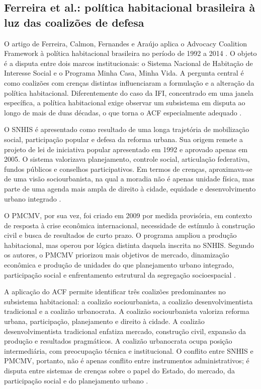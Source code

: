 \documentclass[12pt,a4paper]{article}
\begin{document}
\subsection{Ferreira et al.: política habitacional brasileira à luz das coalizões de defesa}
\label{sec:org0ee8abe}
O artigo de Ferreira, Calmon, Fernandes e Araújo aplica o Advocacy Coalition Framework à política habitacional brasileira no período de 1992 a 2014 \autocite{ferreira2019habitacional}. O objeto é a disputa entre dois marcos institucionais: o Sistema Nacional de Habitação de Interesse Social e o Programa Minha Casa, Minha Vida. A pergunta central é como coalizões com crenças distintas influenciaram a formulação e a alteração da política habitacional. Diferentemente do caso da IFI, concentrado em uma janela específica, a política habitacional exige observar um subsistema em disputa ao longo de mais de duas décadas, o que torna o ACF especialmente adequado \autocites{sabatier1999theories}[][]{ferreira2019habitacional}.

O SNHIS é apresentado como resultado de uma longa trajetória de mobilização social, participação popular e defesa da reforma urbana. Sua origem remete a projeto de lei de iniciativa popular apresentado em 1992 e aprovado apenas em 2005. O sistema valorizava planejamento, controle social, articulação federativa, fundos públicos e conselhos participativos. Em termos de crenças, aproximava-se de uma visão sociourbanista, na qual a moradia não é apenas unidade física, mas parte de uma agenda mais ampla de direito à cidade, equidade e desenvolvimento urbano integrado \autocite{ferreira2019habitacional}.

O PMCMV, por sua vez, foi criado em 2009 por medida provisória, em contexto de resposta à crise econômica internacional, necessidade de estímulo à construção civil e busca de resultados de curto prazo. O programa ampliou a produção habitacional, mas operou por lógica distinta daquela inscrita no SNHIS. Segundo os autores, o PMCMV priorizou mais objetivos de mercado, dinamização econômica e produção de unidades do que planejamento urbano integrado, participação social e enfrentamento estrutural da segregação socioespacial \autocite{ferreira2019habitacional}.

A aplicação do ACF permite identificar três coalizões predominantes no subsistema habitacional: a coalizão sociourbanista, a coalizão desenvolvimentista tradicional e a coalizão urbanocrata. A coalizão sociourbanista valoriza reforma urbana, participação, planejamento e direito à cidade. A coalizão desenvolvimentista tradicional enfatiza mercado, construção civil, expansão da produção e resultados pragmáticos. A coalizão urbanocrata ocupa posição intermediária, com preocupação técnica e institucional. O conflito entre SNHIS e PMCMV, portanto, não é apenas conflito entre instrumentos administrativos; é disputa entre sistemas de crenças sobre o papel do Estado, do mercado, da participação social e do planejamento urbano \autocites{araujoSilva2022coalizoes}[][]{ferreira2019habitacional}.
\end{document}
